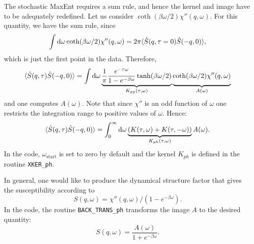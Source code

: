 The  stochastic MaxEnt requires a sum rule, and hence the kernel and image have to be adequately redefined. 
Let us consider $\coth(\beta \omega/2) \chi''(q,\omega)$. For this quantity, we have the sum rule, since
\begin{equation}
	\int \mathrm{d} \omega 	\coth(\beta \omega/2) \chi''(q,\omega) = 
  2 \pi \langle \hat{S}(q,\tau=0) \hat{S}(-q,0) \rangle ,
\end{equation}
which is just the first point in the data. Therefore,
\begin{equation}
	\langle \hat{S}(q,\tau) \hat{S}(-q,0) \rangle  =  
       \int \d \omega  \underbrace{ \frac{1}{\pi} \frac{e^{- \tau \omega} }
            { 1 - e^{-\beta  \omega} } \tanh(\beta \omega/2)  }_{K_{pp}(\tau,\omega)} 
       \underbrace{ \coth(\beta \omega/2) \chi''(q,\omega) \vphantom{\frac{1}{2-1}} }_{A(\omega)} 
\label{Kpp.eq}
\end{equation}
and one computes $A(\omega)$.
Note that since $\chi'' $ is an odd function of $\omega$ one restricts the integration range to positive values of $\omega$. 
Hence: 
\begin{equation}
	\langle \hat{S}(q,\tau) \hat{S}(-q,0) \rangle  =  
       \int_{0}^{\infty}  \mathrm{d} \omega \underbrace{\left( K(\tau,\omega)  + K(\tau,-\omega) \right)}_{K_{ph}(\tau,\omega)}  A(\omega).
\end{equation}
In the code, $\omega_\mathrm{start}$ is set to zero by default and the kernel $K_{ph}$ is defined in the  routine \texttt{XKER\_ph}.

In general,  one would like to produce the  dynamical structure factor that gives the susceptibility according to
\begin{equation}
 S(q,\omega)  = \chi''(q,\omega)/\left( 1 - e^{-\beta  \omega} \right). 
\end{equation}
In the code, the routine \texttt{BACK\_TRANS\_ph} transforms the image $A$ to the desired quantity:
\begin{equation}
	S(q,\omega) = \frac{A(\omega)}{1 + e^{-\beta \omega} } .
\end{equation}
